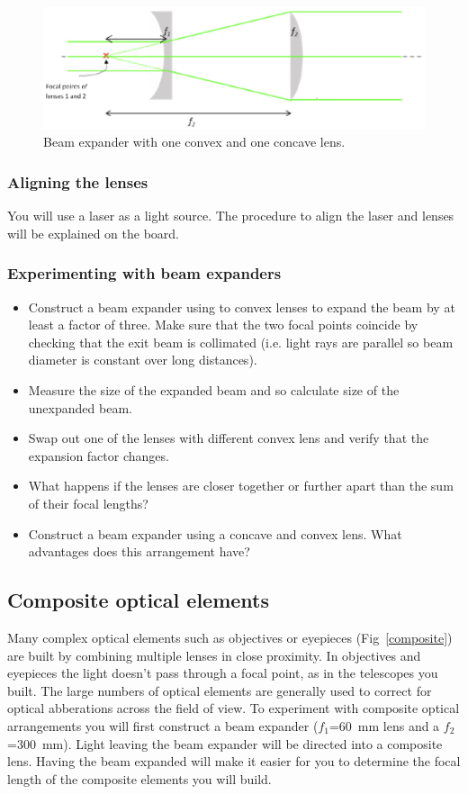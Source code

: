\documentclass[a4paper]{report}
\begin{document}
\begin{figure}[h]
\center
\includegraphics[width=4.5in]{beamExpander2.eps}
\caption{Beam expander with one convex and one concave lens.}
\label{beamExpander2}
\end{figure}

\subsubsection{Aligning the lenses}
You will use a laser as a light source.
The procedure to align the laser and lenses will be explained on the board.

\subsubsection{Experimenting with beam expanders}
\begin{itemize}
\item Construct a beam expander using to convex lenses to expand the beam by at least a factor of three. 
Make sure that the two focal points coincide by checking that the exit beam is collimated
 (i.e. light rays are parallel so beam diameter is constant over long distances). 
\item Measure the size of the expanded beam and so calculate size of the unexpanded beam.
\item Swap out one of the lenses with different convex lens and verify that the expansion factor changes. 
\item What happens if the lenses are closer together or further apart than the sum of their focal lengths?
\item Construct a beam expander using a concave and convex lens. What advantages does this arrangement have?
\end{itemize}

\clearpage

\subsection{Composite optical elements}
Many complex optical elements such as objectives or eyepieces (Fig~\ref{composite}) are built by combining multiple lenses in close proximity. 
In objectives and eyepieces the light doesn't pass through a focal point, as in the telescopes you built. 
The large numbers of optical elements are generally used to correct for optical abberations across the field of view. 
To experiment with composite optical arrangements  you will first construct a beam expander ($f_1$=60~mm lens and a $f_2$=300~mm). 
Light leaving the beam expander will be directed into a composite lens. 
Having the beam expanded will make it easier for you to determine the focal length of the composite elements you will build.
\end{document}
